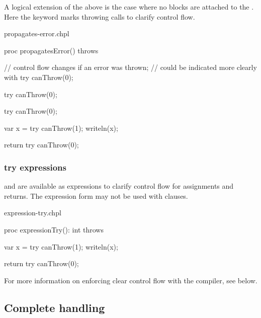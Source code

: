 A logical extension of the above is the case where no  blocks
are attached to the . Here the  keyword marks throwing
calls to clarify control flow.

\begin{chapelexample}{propagates-error.chpl}
\begin{chapel}
proc propagatesError() throws {
  // control flow changes if an error was thrown;
  // could be indicated more clearly with try
  canThrow(0);

  try canThrow(0);

  try {
    canThrow(0);
  }

  var x = try canThrow(1);
  writeln(x);

  return try canThrow(0);
}
\end{chapel}
\begin{chapelpost}
\end{chapelpost}
\begin{chapeloutput}
\end{chapeloutput}
\end{chapelexample}


\subsubsection{try expressions}
\label{try_expressions}

 and  are available as expressions to clarify control flow
for assignments and returns. The expression form may not be used with
 clauses.

\begin{chapelexample}{expression-try.chpl}
\begin{chapel}
proc expressionTry(): int throws {
  var x = try canThrow(1);
  writeln(x);

  return try canThrow(0);
}
\end{chapel}
\begin{chapelpost}
\end{chapelpost}
\begin{chapeloutput}
\end{chapeloutput}
\end{chapelexample}

For more information on enforcing clear control flow with the compiler,
see  below.

\subsection{Complete handling}
\label{Complete_handling}

